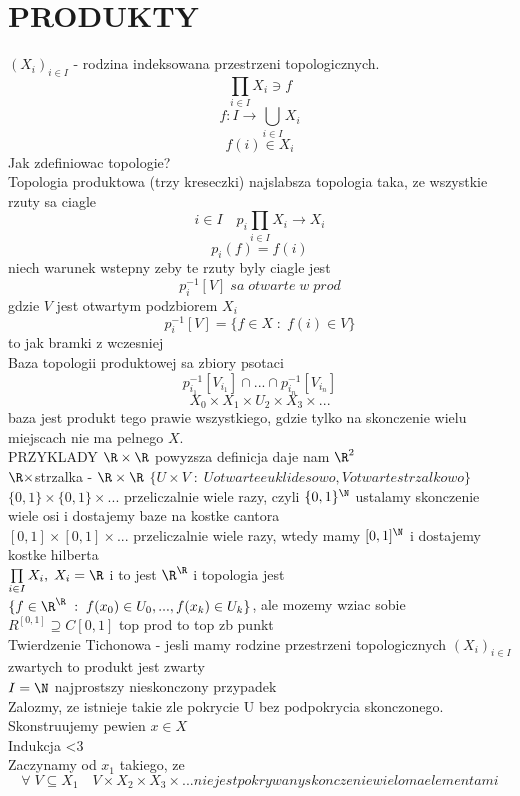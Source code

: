 \documentclass{article}
\begin{document}
\section*{PRODUKTY}
$(X_i)_{i\in I}$ - rodzina indeksowana przestrzeni topologicznych.
$$\prod_{i\in I} X_i \ni f$$
$$f:I\to \bigcup\limits_{i\in I} X_i$$
$$f(i)\in X_i$$
Jak zdefiniowac topologie?\\
Topologia produktowa (trzy kreseczki) najslabsza topologia taka, ze wszystkie rzuty sa ciagle\bigskip\\
$$i\in I\quad p_i\prod\limits_{i\in I} X_i\to X_i$$
$$p_i(f)=f(i)$$
niech warunek wstepny zeby te rzuty byly ciagle jest\bigskip\\
$$p_i^{-1}[V] \;sa\;otwarte\;w\;prod$$
gdzie $V$ jest otwartym podzbiorem $X_i$\\
$$p_i^{-1}[V]=\{f\in X\;:\;f(i)\in V\}$$
to jak bramki z wczesniej\bigskip\\
Baza topologii produktowej sa zbiory psotaci
$$p_{i_1}^{-1}[V_{i_1}]\cap ...\cap p_{i_n}^{-1}[V_{i_n}]$$
$$X_0\times X_1\times U_2\times X_3\times...$$
baza jest produkt tego prawie wszystkiego, gdzie tylko na skonczenie wielu miejscach nie ma pelnego $X$.\\
PRZYKLADY
$\R\times\R$ powyzsza definicja daje nam $\R^2$\\
$\R\times$strzalka - $\R\times\R$ $\{U\times V\;:\;U otwarte euklidesowo, V otwarte strzalkowo\}$\\
$\{0, 1\}\times\{0, 1\}\times...$ przeliczalnie wiele razy, czyli $\{0,1\}^\N$ ustalamy skonczenie wiele osi i dostajemy baze na kostke cantora\\
$[0, 1]\times [0, 1]\times...$ przeliczalnie wiele razy, wtedy mamy $[0,1]^\N$ i dostajemy kostke hilberta\\
$\prod\limits_{i\in I}X_i,\; X_i=\R$ i to jest $\R^\R$ i topologia jest $\{f\in\R^\R\;:\;f(x_0)\in U_0,..., f(x_k)\in U_k\}$, ale mozemy wziac sobie $R^{[0,1]} \supseteq C[0,1]$ top prod to top zb punkt\bigskip\\
Twierdzenie Tichonowa - jesli mamy rodzine przestrzeni topologicznych $(X_i)_{i\in I}$ zwartych to produkt jest zwarty\\
\dowod
$I=\N$
najprostszy nieskonczony przypadek\\
Zalozmy, ze istnieje takie zle pokrycie U bez podpokrycia skonczonego. Skonstruujemy pewien $x\in X$\\
Indukcja <3\\
Zaczynamy od $x_1$ takiego, ze
$$\forall \;V\subseteq X_1\quad V\times X_2\times X_3\times... nie jest pokrywany skonczenie wieloma elementami$$
\end{document}
